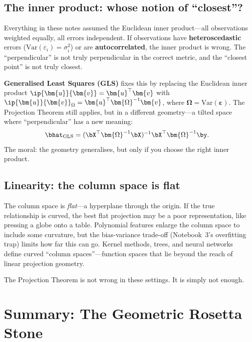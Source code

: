 \subsection{The inner product: whose notion of ``closest''?}

Everything in these notes assumed the Euclidean inner product---all
observations weighted equally, all errors independent.
If observations have \textbf{heteroscedastic} errors
($\text{Var}(\varepsilon_i) = \sigma_i^2$) or are
\textbf{autocorrelated},
the inner product is wrong.
The ``perpendicular'' is not truly perpendicular in the correct metric,
and the ``closest point'' is not truly closest.

\textbf{Generalised Least Squares (GLS)} fixes this by replacing the
Euclidean inner product $\ip{\bm{u}}{\bm{v}}=\bm{u}^\top\bm{v}$ with
$\ip{\bm{u}}{\bm{v}}_\Omega = \bm{u}^\top\bm{\Omega}^{-1}\bm{v}$,
where $\bm{\Omega} = \text{Var}(\bm{\varepsilon})$.
The Projection Theorem still applies, but in a different geometry---a
tilted space where ``perpendicular'' has a new meaning:
\[
  \bhat_{\text{GLS}}
  = (\bX^\top\bm{\Omega}^{-1}\bX)^{-1}\bX^\top\bm{\Omega}^{-1}\by.
\]
The moral: the geometry generalises, but only if you choose the right
inner product.

\subsection{Linearity: the column space is flat}

The column space is \emph{flat}---a hyperplane through the origin.
If the true relationship is curved, the best flat projection may be
a poor representation, like pressing a globe onto a table.
Polynomial features enlarge the column space to include some curvature,
but the bias-variance trade-off (Notebook~3's overfitting trap) limits
how far this can go.
Kernel methods, trees, and neural networks define curved ``column
spaces''---function spaces that lie beyond the reach of linear
projection geometry.

The Projection Theorem is not wrong in these settings.  It is simply
not enough.


\section{Summary: The Geometric Rosetta Stone}\label{sec:rosetta}


